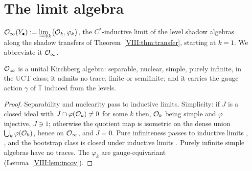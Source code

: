 \section{The limit algebra}\label{VIII:sec:limit}

\begin{definition}\label{VIII:def:limit}
$\mathcal{O}_\infty(Y_\bullet):=\varinjlim_k\bigl(\mathcal{O}_k,\varphi_k\bigr)$, the $C^*$-inductive limit
of the level shadow algebras along the shadow transfers of Theorem~\ref{VIII:thm:transfer},
starting at $k=1$. We abbreviate it $\mathcal{O}_\infty$.
\end{definition}

\begin{theorem}\label{VIII:thm:kirchberg}
$\mathcal{O}_\infty$ is a unital Kirchberg algebra: separable, nuclear, simple, purely infinite,
in the UCT class; it admits no trace, finite or semifinite; and it carries the gauge
action $\gamma$ of $\mathbb T$ induced from the levels.
\end{theorem}

\begin{proof}
Separability and nuclearity pass to inductive limits. Simplicity: if $J$ is a closed
ideal with $J\cap\varphi(\mathcal{O}_k)\ne0$ for some $k$ then, $\mathcal{O}_k$ being simple and
$\varphi$ injective, $J\ni1$; otherwise the quotient map is isometric on the dense union
$\bigcup_k\varphi(\mathcal{O}_k)$, hence on $\mathcal{O}_\infty$, and $J=0$. Pure infiniteness passes to
inductive limits \cite[\S4]{KR}, \cite[\S4.1]{Ro}, and the bootstrap class is closed
under inductive limits \cite{RS}. Purely infinite simple algebras have no traces. The
$\varphi_k$ are gauge-equivariant (Lemma~\ref{VIII:lem:incov}).
\end{proof}

